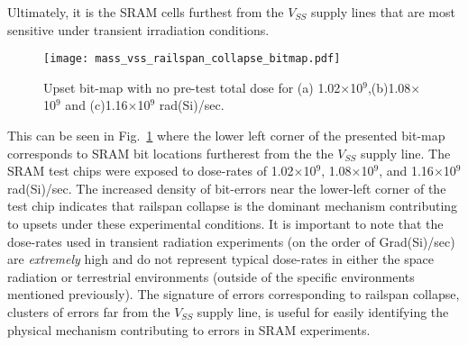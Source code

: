 Ultimately, it is the SRAM cells furthest from the $V_{SS}$ supply lines that are most sensitive under transient irradiation conditions.
\begin{figure}[htbp]
    \begin{center}
        \texttt{[image: mass\_vss\_railspan\_collapse\_bitmap.pdf]}
    \end{center}
    \caption{Upset bit-map with no pre-test total dose for (a) 1.02$\times$10$^9$,(b)1.08$\times$10$^9$ and (c)1.16$\times$10$^9$ rad(Si)/sec.}
    \label{fig:railspan_coll_bit_map}
\end{figure}
This can be seen in Fig.~\ref{fig:railspan_coll_bit_map} where the lower left corner of the presented bit-map corresponds to SRAM bit locations furtherest from the the $V_{SS}$ supply line.
The SRAM test chips were exposed to dose-rates of 1.02$\times$10$^9$, 1.08$\times$10$^9$, and 1.16$\times$10$^9$ rad(Si)/sec.
The increased density of bit-errors near the lower-left corner of the test chip indicates that railspan collapse is the dominant mechanism contributing to upsets under these experimental conditions.
It is important to note that the dose-rates used in transient radiation experiments (on the order of Grad(Si)/sec) are \emph{extremely} high and do not represent typical dose-rates in either the space radiation or terrestrial environments (outside of the specific environments mentioned previously).
The signature of errors corresponding to railspan collapse, clusters of errors far from the $V_{SS}$ supply line, is useful for easily identifying the physical mechanism contributing to errors in SRAM experiments.


